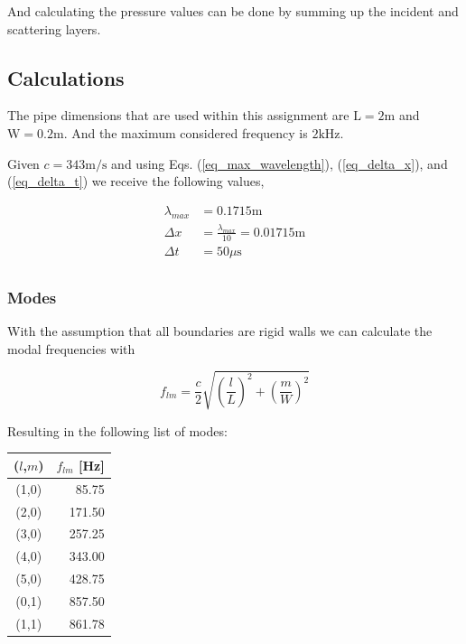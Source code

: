 \documentclass[twocolumn]{article}
\begin{document}
And calculating the pressure values can be done by summing up the incident and
scattering layers.

\subsection{Calculations}
The pipe dimensions that are used within this assignment are $\text{L}=2\text{m}$
and $\text{W}=0.2\text{m}$.
And the maximum considered frequency is $2 \text{kHz}$.

Given $c=343\text{m/s}$ and using Eqs. (\ref{eq_max_wavelength}), (\ref{eq_delta_x}),
and (\ref{eq_delta_t}) we receive the following values,

\begin{equation}
\begin{aligned}
    \lambda_{max} &= 0.1715\text{m} \\
    \Delta x &= \frac{\lambda_{max}}{10} = 0.01715\text{m} \\
    \Delta t &= 50\mu\text{s} \\
\end{aligned}
\end{equation}

\subsubsection{Modes}
With the assumption that all boundaries are rigid walls we can calculate the modal
frequencies \cite{CavitiesWaveguides} with

\begin{equation}
    f_{lm} = \frac{c}{2}\sqrt{\left(\frac{l}{L}\right)^2 + \left(\frac{m}{W}\right)^2}
\end{equation}

Resulting in the following list of modes:

\begin{center}
\begin{tabular}{c|r}
    ($l$,$m$) & $f_{lm}$ [Hz] \\
    \hline
    (1,0) & 85.75 \\
    (2,0) & 171.50 \\
    (3,0) & 257.25 \\
    (4,0) & 343.00 \\
    (5,0) & 428.75 \\
    (0,1) & 857.50 \\
    (1,1) & 861.78 \\
\end{tabular}
\end{center}
\end{document}
